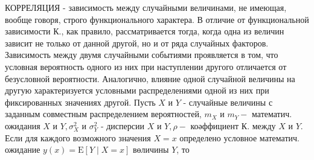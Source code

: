 \documentclass[10pt]{article}
\begin{document}
КОРРЕЛЯЦИЯ - зависимость между случайными величинами, не имеющая, вообще говоря, строго функционального характера. В отличие от функциональной зависимости К., как правило, рассматривается тогда, когда одна из величин зависит не только от данной другой, но и от ряда случайных факторов. Зависимость между двумя случайными событиями проявляется в том, что условная вероятность одного из них при наступлении другого отличается от безусловной вероятности. Аналогично, влияние одной случайной величины на другую характеризуется условными распределениями одной из них при фиксированных значениях другой. Пусть $X$ и $Y$ - случайные величины с заданным совместным распределением вероятностей, $m_{X}$ и $m_{Y}-$ математич. ожидания $X$ и $Y, \sigma_{X}^{2}$ и $\sigma_{Y}^{2}$ - дисперсии $X$ и $Y, \rho-$ коәффициент $К$. между $X$ и $Y$. Если для каждого возможного значения $X=x$ определено условное математич. ожидание $y(x)=\mathrm{E}[Y \mid X=x]$ вөличины $Y$, то
\end{document}
